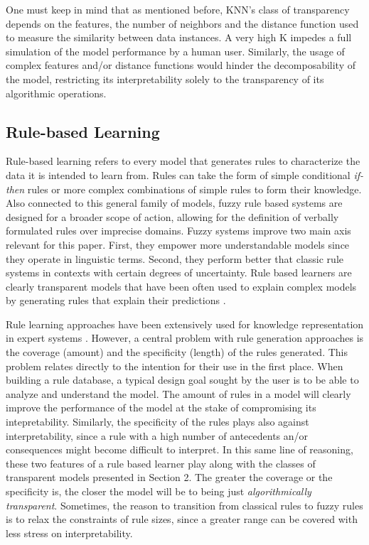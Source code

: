 \documentclass[final]{elsarticle}
\begin{document}
One must keep in mind that as mentioned before, KNN's class of transparency depends on the features, the number of neighbors and the distance function used to measure the similarity between data instances. A very high K impedes a full simulation of the model performance by a human user. Similarly, the usage of complex features and/or distance functions would hinder the decomposability of the model, restricting its interpretability solely to the transparency of its algorithmic operations.

\subsection{Rule-based Learning} \label{ref:rbl}

Rule-based learning refers to every model that generates rules to characterize the data it is intended to learn from. Rules can take the form of simple conditional \textit{if-then} rules or more complex combinations of simple rules to form their knowledge. Also connected to this general family of models, fuzzy rule based systems are designed for a broader scope of action, allowing for the definition of verbally formulated rules over imprecise domains. Fuzzy systems improve two main axis relevant for this paper. First, they empower more understandable models since they operate in linguistic terms. Second, they perform better that classic rule systems in contexts with certain degrees of uncertainty. Rule based learners are clearly transparent models that have been often used to explain complex models by generating rules that explain their predictions \cite{nunez2002rule,nunez2006rule,RuleExtractionInThere,   ProductionRulesFromTrees}. 

Rule learning approaches have been extensively used for knowledge representation in expert systems \cite{RULElangley1995applications}. However, a central problem with rule generation approaches is the coverage (amount) and the specificity (length) of the rules generated. This problem relates directly to the intention for their use in the first place. When building a rule database, a typical design goal sought by the user is to be able to analyze and understand the model. The amount of rules in a model will clearly improve the performance of the model at the stake of compromising its intepretability. Similarly, the specificity of the rules plays also against interpretability, since a rule with a high number of antecedents an/or consequences might become difficult to interpret. In this same line of reasoning, these two features of a rule based learner play along with the classes of transparent models presented in Section 2. The greater the coverage or the specificity is, the closer the model will be to being just \textit{algorithmically transparent}. Sometimes, the reason to transition from classical rules to fuzzy rules is to relax the constraints of rule sizes, since a greater range can be covered with less stress on interpretability. 
\end{document}
